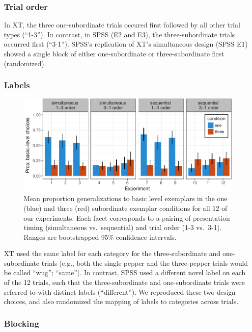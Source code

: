 \documentclass[english,floatsintext,man]{apa6}
\theoremstyle{definition}
\theoremstyle{definition}
\theoremstyle{remark}
\begin{document}
\subsubsection{Trial order}\label{trial-order}

In XT, the three one-subordinate trials occured first followed by all
other trial types (\enquote{1-3}). In contrast, in SPSS (E2 and E3), the
three-subordinate trials occurred first (\enquote{3-1}). SPSS's
replication of XT's simultaneous design (SPSS E1) showed a single block
of either one-subordinate or three-subordinate first (randomized).

\subsubsection{Labels}\label{labels}

\begin{figure}
\centering
\includegraphics{xtmem_files/figure-latex/unnamed-chunk-3-1.pdf}
\caption{\label{fig:unnamed-chunk-3}Mean proportion generalizations to basic
level exemplars in the one (blue) and three (red) subordinate exemplar
conditions for all 12 of our experiments. Each facet corresponds to a
pairing of presentation timing (simultaneous vs.~sequential) and trial
order (1-3 vs.~3-1). Ranges are bootstrapped 95\% confidence intervals.}
\end{figure}

XT used the same label for each category for the three-subordinate and
one-subordinate trials (e.g., both the single pepper and the
three-pepper trials would be called \enquote{wug}; \enquote{same}). In
contrast, SPSS used a different novel label on each of the 12 trials,
such that the three-subordinate and one-subordinate trials were referred
to with distinct labels (\enquote{different}). We reproduced these two
design choices, and also randomized the mapping of labels to categories
across trials.

\subsubsection{Blocking}\label{blocking}
\end{document}

